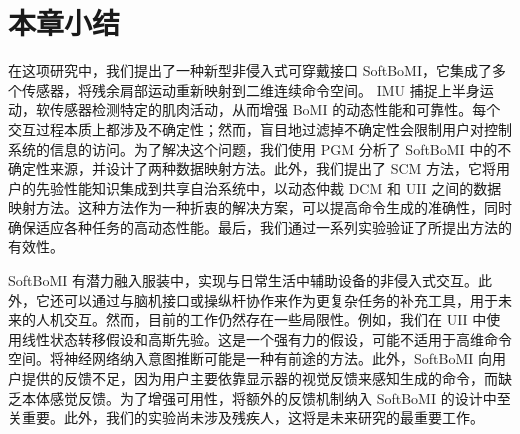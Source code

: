  \section{本章小结}在这项研究中，我们提出了一种新型非侵入式可穿戴接口 SoftBoMI，它集成了多个传感器，将残余肩部运动重新映射到二维连续命令空间。 IMU 捕捉上半身运动，软传感器检测特定的肌肉活动，从而增强 BoMI 的动态性能和可靠性。每个交互过程本质上都涉及不确定性；然而，盲目地过滤掉不确定性会限制用户对控制系统的信息的访问。为了解决这个问题，我们使用 PGM 分析了 SoftBoMI 中的不确定性来源，并设计了两种数据映射方法。此外，我们提出了 SCM 方法，它将用户的先验性能知识集成到共享自治系统中，以动态仲裁 DCM 和 UII 之间的数据映射方法。这种方法作为一种折衷的解决方案，可以提高命令生成的准确性，同时确保适应各种任务的高动态性能。最后，我们通过一系列实验验证了所提出方法的有效性。  

SoftBoMI 有潜力融入服装中，实现与日常生活中辅助设备的非侵入式交互。此外，它还可以通过与脑机接口或操纵杆协作来作为更复杂任务的补充工具，用于未来的人机交互。然而，目前的工作仍然存在一些局限性。例如，我们在 UII 中使用线性状态转移假设和高斯先验。这是一个强有力的假设，可能不适用于高维命令空间。将神经网络纳入意图推断可能是一种有前途的方法。此外，SoftBoMI 向用户提供的反馈不足，因为用户主要依靠显示器的视觉反馈来感知生成的命令，而缺乏本体感觉反馈。为了增强可用性，将额外的反馈机制纳入 SoftBoMI 的设计中至关重要。此外，我们的实验尚未涉及残疾人，这将是未来研究的最重要工作。  
